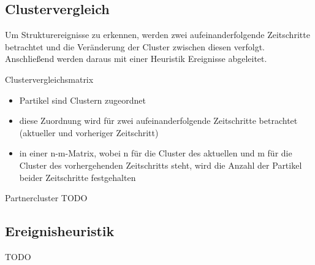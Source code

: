 \documentclass[10pt]{beamer}
\begin{document}
\subsection{Clustervergleich}

\begin{frame}
	Um Strukturereignisse zu erkennen, werden zwei aufeinanderfolgende Zeitschritte betrachtet und die Veränderung der Cluster zwischen diesen verfolgt. Anschließend werden daraus mit einer Heuristik Ereignisse abgeleitet.
\end{frame}

\begin{frame}{Clustervergleichsmatrix}
	\begin{itemize}
		\item Partikel sind Clustern zugeordnet
		\item diese Zuordnung wird für zwei aufeinanderfolgende Zeitschritte betrachtet (aktueller und vorheriger Zeitschritt)
		\item in einer n-m-Matrix, wobei n für die Cluster des aktuellen und m für die Cluster des vorhergehenden Zeitschritts steht, wird die Anzahl der Partikel beider Zeitschritte festgehalten

	\end{itemize}
\end{frame}

\begin{frame}{Partnercluster}
TODO
\end{frame}

\subsection{Ereignisheuristik}
\begin{frame}
TODO
\end{frame}
\end{document}
